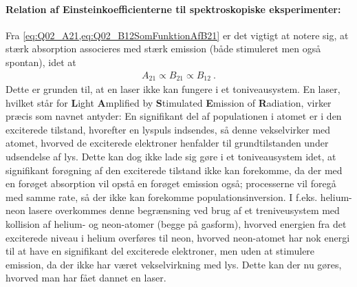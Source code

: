 \paragraph{Relation af Einsteinkoefficienterne til spektroskopiske eksperimenter:} Fra \cref{eq:Q02_A21,eq:Q02_B12SomFunktionAfB21} er det vigtigt at notere sig, at stærk absorption associeres med stærk emission (både stimuleret men også spontan), idet at
\begin{align*}
    A_{21} \propto B_{21} \propto B_{12} \: .
\end{align*}
Dette er grunden til, at en laser ikke kan fungere i et toniveausystem. En laser, hvilket står for \textbf{L}ight \textbf{A}mplified by \textbf{S}timulated \textbf{E}mission of \textbf{R}adiation, virker præcis som navnet antyder: En signifikant del af populationen i atomet er i den exciterede tilstand, hvorefter en lyspuls indsendes, så denne vekselvirker med atomet, hvorved de exciterede elektroner henfalder til grundtilstanden under udsendelse af lys. Dette kan dog ikke lade sig gøre i et toniveausystem idet, at signifikant forøgning af den exciterede tilstand ikke kan forekomme, da der med en forøget absorption vil opstå en forøget emission også; processerne vil foregå med samme rate, så der ikke kan forekomme \textsf{populationsinversion}. I f.eks. helium-neon lasere overkommes denne begrænsning ved brug af et treniveusystem med kollision af helium- og neon-atomer (begge på gasform), hvorved energien fra det exciterede niveau i helium overføres til neon, hvorved neon-atomet har nok energi til at have en signifikant del exciterede elektroner, men uden at stimulere emission, da der ikke har været vekselvirkning med lys. Dette kan der nu gøres, hvorved man har fået dannet en laser.